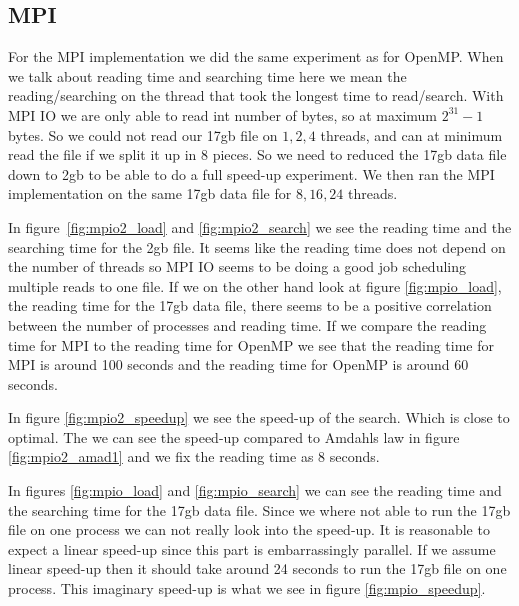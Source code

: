 \documentclass[a4paper,10pt]{article}
\begin{document}
\clearpage
\subsection{MPI}
  For the MPI implementation we did the same experiment as for OpenMP. When we talk about
  reading time and searching time here we mean the reading/searching on the thread that
  took the longest time to read/search.
  With MPI IO we are only able to read int number of bytes, so at maximum $2^{31}-1$ bytes.
  So we could not read our 17gb file on $1,2,4$ threads, and can at minimum read the file if we
  split it up in 8  pieces.  So we need to reduced the 17gb data file down to 2gb to be able to do a full
  speed-up experiment.  We then ran the MPI implementation on the same 17gb data file for 
  $8,16,24$ threads.

  In figure~\ref{fig:mpio2_load} and \ref{fig:mpio2_search} we see the reading time and
  the searching time for the 2gb file.  It seems like the reading time does not depend
  on the number of threads so MPI IO seems to be doing a good job scheduling multiple 
  reads to one file.  If we on the other hand look at figure \ref{fig:mpio_load}, 
  the reading time for the 17gb data file, there seems to be a positive correlation
  between the number of processes and reading time. If we compare the reading time
  for MPI to the reading time for OpenMP we see that the reading time
  for MPI is around 100 seconds and the reading time for OpenMP is around 60 seconds.
  

  In figure \ref{fig:mpio2_speedup} we see the speed-up of the search.  Which is
  close to optimal.  The we can see the speed-up compared to Amdahls law in figure \ref{fig:mpio2_amad1}
  and we fix the reading time as $8$ seconds.

  In figures \ref{fig:mpio_load} and \ref{fig:mpio_search} we can see the reading time and 
  the searching time for the 17gb data file.  Since we where not able to run the 17gb file 
  on one process we can not really look into the speed-up.  
  It is reasonable to expect a linear speed-up since this part is embarrassingly parallel.
  If we assume linear speed-up then it should take around 24 seconds to run the 17gb file on one process.
  This imaginary speed-up is what we see in figure \ref{fig:mpio_speedup}.
\end{document}
